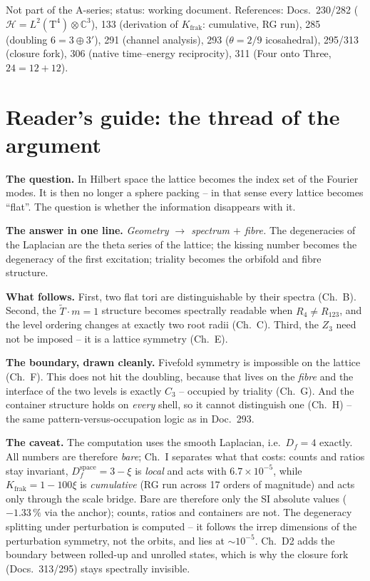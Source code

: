 \documentclass[11pt]{report}
\begin{document}
Not part of the A-series; status: working document. References:
Docs.~230/282 ($\mathcal{H} = L^2(\text{T}^4)\otimes\mathbb{C}^3$),
133 (derivation of $K_\text{frak}$: cumulative, RG run), 285
(doubling $6 = 3\oplus3'$), 291 (channel analysis), 293
($\theta = 2/9$ icosahedral), 295/313 (closure fork), 306 (native time--energy
reciprocity), 311 (Four onto Three, $24 = 12+12$).

\section*{Reader's guide: the thread of the argument}

\textbf{The question.} In Hilbert space the lattice becomes the
index set of the Fourier modes. It is then no longer a sphere
packing -- in that sense every lattice becomes \enquote{flat}. The
question is whether the information disappears with it.

\textbf{The answer in one line.} \emph{Geometry $\to$ spectrum $+$
fibre.} The degeneracies of the Laplacian are the theta series of
the lattice; the kissing number becomes the degeneracy of the first
excitation; triality becomes the orbifold and fibre structure.

\textbf{What follows.} First, two flat tori are distinguishable by
their spectra (Ch.~B). Second, the $\tilde T\cdot m = 1$ structure
becomes spectrally readable when $R_4 \ne R_{123}$, and the level
ordering changes at exactly two root radii (Ch.~C). Third, the
$Z_3$ need not be imposed -- it is a lattice symmetry (Ch.~E).

\textbf{The boundary, drawn cleanly.} Fivefold symmetry is
impossible on the lattice (Ch.~F). This does not hit the doubling,
because that lives on the \emph{fibre} and the interface of the two
levels is exactly $C_3$ -- occupied by triality (Ch.~G). And the
container structure holds on \emph{every} shell, so it cannot
distinguish one (Ch.~H) -- the same pattern-versus-occupation logic
as in Doc.~293.

\textbf{The caveat.} The computation uses the smooth Laplacian,
i.e.\ $D_f = 4$ exactly. All numbers are therefore \emph{bare};
Ch.~I separates what that costs: counts and ratios stay invariant,
$D_f^\text{space} = 3-\xi$ is \emph{local} and acts with
$6.7\times10^{-5}$, while $K_\text{frak} = 1-100\xi$ is
\emph{cumulative} (RG run across 17 orders of magnitude) and acts
only through the scale bridge. Bare are therefore only the SI
absolute values ($-1.33\,\%$ via the anchor); counts, ratios and
containers are not. The degeneracy splitting under perturbation is
computed -- it follows the irrep dimensions of the perturbation
symmetry, not the orbits, and lies at $\sim10^{-5}$. Ch.~D2 adds
the boundary between rolled-up and unrolled states, which is why
the closure fork (Docs.~313/295) stays spectrally invisible.
\end{document}
